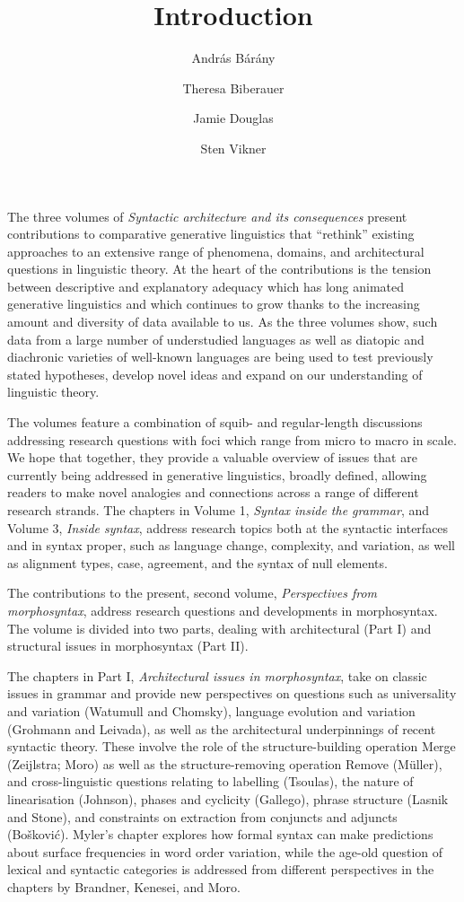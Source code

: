 \documentclass[output=paper]{langsci/langscibook}
\author{András Bárány\affiliation{Bielefeld University}\and
        Theresa Biberauer\affiliation{University of Cambridge, Stellenbosch
        University, University of the West Cape}\and
        Jamie Douglas\affiliation{University of Cambridge}\and
        Sten Vikner\affiliation{Aarhus University}}
\title{Introduction}
\begin{document}
\noindent The three volumes of \emph{Syntactic architecture and its
consequences} present contributions to comparative generative linguistics that
\enquote{rethink} existing approaches to an extensive range of phenomena,
domains, and architectural questions in linguistic theory. At the heart of the
contributions is the tension between descriptive and explanatory adequacy which
has long animated generative linguistics and which continues to grow thanks to
the increasing amount and diversity of data available to us. As the three
volumes show, such data from a large number of understudied languages as well
as diatopic and diachronic varieties of well-known languages are being used to
test previously stated hypotheses, develop novel ideas and expand on our
understanding of linguistic theory.

The volumes feature a combination of squib- and regular-length discussions
addressing research questions with foci which range from micro to macro in
scale. We hope that together, they provide a valuable overview of issues that
are currently being addressed in generative linguistics, broadly defined,
allowing readers to make novel analogies and connections across a range of
different research strands. The chapters in Volume 1, \emph{Syntax inside the
grammar}, and Volume 3, \emph{Inside syntax}, address research topics both at
the syntactic interfaces and in syntax proper, such as language change,
complexity, and variation, as well as alignment types, case, agreement, and the
syntax of null elements.

The contributions to the present, second volume, \emph{Perspectives from
morphosyntax}, address research questions and developments in morphosyntax.
The volume is divided into two parts, dealing with architectural (Part I) and
structural issues in morphosyntax (Part II).

The chapters in Part I, \emph{Architectural issues in morphosyntax}, take on
classic issues in grammar and provide new perspectives on questions such as
universality and variation (Watumull and Chomsky), language evolution and
variation (Grohmann and Leivada), as well as the architectural underpinnings of
recent syntactic theory. These involve the role of the structure-building
operation Merge (Zeijlstra; Moro) as well as the structure-removing operation
Remove (Müller), and cross-linguistic questions relating to labelling
(Tsoulas), the nature of linearisation (Johnson), phases and cyclicity
(Gallego), phrase structure (Lasnik and Stone), and constraints on extraction
from conjuncts and adjuncts (Bošković). Myler’s chapter explores how formal
syntax can make predictions about surface frequencies in word order variation,
while the age-old question of lexical and syntactic categories is addressed
from different perspectives in the chapters by Brandner, Kenesei, and Moro.
\end{document}
